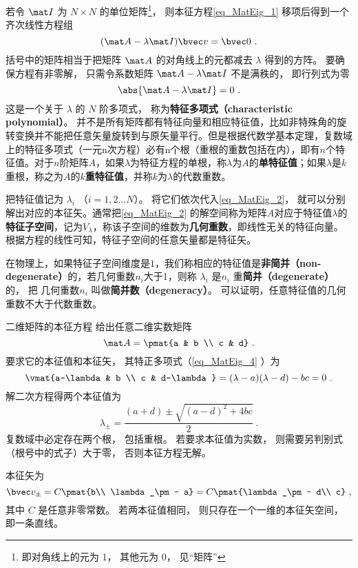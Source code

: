 若令 $\mat I$ 为 $N\times N$ 的单位矩阵\footnote{即对角线上的元为 1， 其他元为 0， 见“矩阵”}， 则本征方程\autoref{eq_MatEig_1} 移项后得到一个齐次线性方程组
\begin{equation}\label{eq_MatEig_2}
(\mat A - \lambda\mat I)\bvec v = \bvec 0~.
\end{equation}
括号中的矩阵相当于把矩阵 $\mat A$ 的对角线上的元都减去 $\lambda$ 得到的方阵。 要确保方程有非零解， 只需令系数矩阵 $\mat A - \lambda\mat I$ 不是满秩的， 即行列式为零
\begin{equation}\label{eq_MatEig_4}
\abs{\mat A - \lambda\mat I} = 0~.
\end{equation}
这是一个关于 $\lambda$ 的 $N$ 阶多项式， 称为\textbf{特征多项式（characteristic polynomial）}。 并不是所有矩阵都有特征向量和相应特征值，比如非特殊角的旋转变换并不能把任意矢量旋转到与原矢量平行。但是根据代数学基本定理，复数域上的特征多项式（一元n次方程）必有n个根（重根的重数包括在内），即有$n$个特征值。对于$n$阶矩阵$A$，如果$\lambda$为特征方程的单根，称$\lambda$为$A$的\textbf{单特征值}；如果$\lambda$是$k$重根，称之为$A$的\textbf{$k$重特征值}，并称$k$为$\lambda$的代数重数。

把特征值记为 $\lambda_i$ （$i = 1, 2\dots N$）。 将它们依次代入\autoref{eq_MatEig_2}， 就可以分别解出对应的本征矢。通常把\autoref{eq_MatEig_2} 的解空间称为矩阵$A$对应于特征值$\lambda$的\textbf{特征子空间}，记为$V_{\lambda}$，称该子空间的维数为\textbf{几何重数}，即线性无关的特征向量。根据方程的线性可知，特征子空间的任意矢量都是特征矢。

在物理上，如果特征子空间维度是$1$，我们称相应的特征值是\textbf{非简并（non-degenerate）}的，若几何重数$n_i$大于1，则称 $\lambda_i$  是$n_i$ 重\textbf{简并（degenerate）}的， 把 几何重数$n_i$ 叫做\textbf{简并数（degeneracy）}。
可以证明，任意特征值的几何重数不大于代数重数。


\begin{example}{二维矩阵的本征方程}
给出任意二维实数矩阵
\begin{equation}
\mat A = \pmat{a & b \\ c & d}~.
\end{equation}
要求它的本征值和本征矢， 其特正多项式（\autoref{eq_MatEig_4} ）为
\begin{equation}
\vmat{a-\lambda & b \\ c & d-\lambda} = (\lambda-a)(\lambda-d) - bc = 0~.
\end{equation}
解二次方程得两个本征值为
\begin{equation}
\lambda_\pm = \frac{(a + d) \pm \sqrt{(a-d)^2 + 4bc}}{2}~.
\end{equation}
复数域中必定存在两个根， 包括重根。 若要求本征值为实数， 则需要另判别式（根号中的式子）大于零， 否则本征方程无解。

本征矢为
\begin{equation}
\bvec v_\pm = C\pmat{b\\ \lambda_\pm - a} = C\pmat{\lambda_\pm - d\\ c}~,
\end{equation}
其中 $C$ 是任意非零常数。 若两本征值相同， 则只存在一个一维的本征矢空间， 即一条直线。
\end{example}

